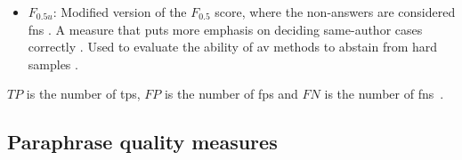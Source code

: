 \begin{itemize}
    \item $F_{0.5u}$: Modified version of the $F_{0.5}$ score, where the non-answers are considered \acp{fn} \citep{bevendorff_overview_2024}. 
    A measure that puts more emphasis on deciding same-author cases correctly \citep{weerasinghe_feature_vector_difference_2021}.
    Used to evaluate the ability of \ac{av} methods to abstain from hard samples \citep{tyo_state_2022}.
\end{itemize}
$TP$ is the number of \aclp{tp}, $FP$ is the number of \aclp{fp} 
and $FN$ is the number of \aclp{fn}~\citep{chen_web_2008}.






\subsection{Paraphrase quality measures}
\label{subsec:paraphrase_quality_measures}



